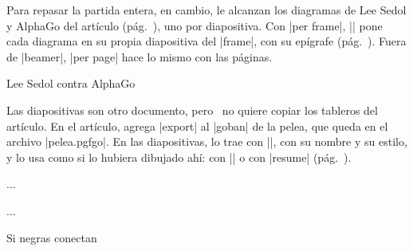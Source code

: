 \begin{goban}

Para repasar la partida entera, en cambio, le alcanzan los diagramas de Lee Sedol y AlphaGo del artículo (pág.~\pageref{tut:partida}), uno por diapositiva. Con |per frame|, |\sgfdiagrams| pone cada diagrama en su propia diapositiva del |frame|, con su epígrafe (pág.~\pageref{subsec:disposicion}). Fuera de |beamer|, |per page| hace lo mismo con las páginas.

\begin{codeexample}
	\begin{frame}{Lee Sedol contra AlphaGo}
		\centering
	\end{frame}
\end{codeexample}

Las diapositivas son otro documento, pero \karu\ no quiere copiar los tableros del artículo. En el artículo, agrega |export| al |goban| de la pelea, que queda en el archivo |pelea.pgfgo|. En las diapositivas, lo trae con |\pgfgoimport|, con su nombre y su estilo, y lo usa como si lo hubiera dibujado ahí: con |\pgfgoview| o con |resume| (pág.~\pageref{subsec:exportar}).

\begin{codeexample}[code only]
	\begin{goban}[partial = A1:G7, name = pelea, export = pelea]
		...
	\end{goban}

	...
	\begin{frame}{Si negras conectan}
		\begin{goban}[resume = {pelea, marks}, partial = auto]
		\end{goban}
	\end{frame}
\end{codeexample}


\end{goban}
